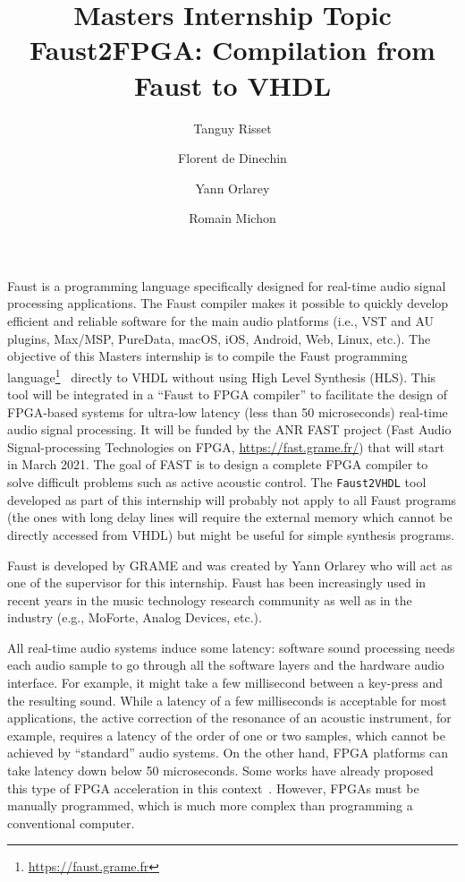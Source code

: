 \documentclass[a4paper,francais,11]{article}
\title{Masters Internship Topic\\
  Faust2FPGA: Compilation from Faust to VHDL}
\date{}
\author[1]{Tanguy Risset}
\author[1]{Florent de Dinechin}
\author[2]{Yann Orlarey}
\author[2]{Romain Michon}
\affil[1]{Citi/Socrate, Insa-Lyon, Inria~\url{https://team.inria.fr/socrate/} }
\affil[2]{GRAME-CNCM, Lyon~\url{http://www.grame.fr/}}
\begin{document}
\maketitle

Faust is a programming language specifically designed for real-time audio signal processing applications. The Faust compiler makes it possible to quickly develop efficient and reliable software for the main audio platforms (i.e., VST and AU plugins, Max/MSP, PureData, macOS, iOS, Android, Web, Linux, etc.). The objective of this Masters internship is to compile the Faust programming language\footnote{\url{https://faust.grame.fr}}~\cite{faust} directly to VHDL without using High Level Synthesis (HLS). This tool will be integrated in a  ``Faust to FPGA compiler'' to facilitate the design of FPGA-based systems for ultra-low latency (less than 50 microseconds) real-time audio signal processing. It will be funded by the ANR FAST project (Fast Audio Signal-processing Technologies on FPGA, \url{https://fast.grame.fr/}) that will start in March 2021. The goal of FAST is to design a complete FPGA compiler to solve difficult problems such as active acoustic control. The {\tt Faust2VHDL} tool developed as part of this internship will probably not apply to all Faust programs (the ones with long delay lines will require the external memory which cannot be directly accessed from VHDL) but might be useful for simple synthesis programs.

 Faust is developed by GRAME and was created by Yann Orlarey who will act as one of the supervisor for this internship. Faust has been increasingly used in recent years in the music technology research community as well as in the industry (e.g., MoForte, Analog Devices, etc.).

All real-time audio systems induce some latency: software sound processing needs each audio sample to go through all the software layers and the hardware audio interface. For example, it might take a few millisecond between a key-press and the resulting sound. While a latency of a few milliseconds is acceptable for most applications, the active correction of the resonance of an acoustic instrument, for example, requires a latency of the order of one or two samples, which cannot be achieved by ``standard'' audio systems. On the other hand, FPGA platforms can take latency down below 50 microseconds. Some works have already proposed this type of FPGA acceleration in this context~\cite{Kuper}. However, FPGAs must be manually programmed, which is much more complex than programming a conventional computer.
\end{document}
